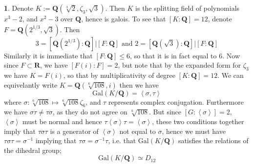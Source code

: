 \documentclass[11pt]{article}
\theoremstyle{definition}
\newtheorem{pb}{}
\newcommand{\gen}[1]{\left\langle #1 \right\rangle}
\newcommand{\tand}{\text{ and }}
\newcommand{\gal}{\text{Gal}}
\begin{document}
    \begin{pb}
        Denote \(K := \mathbf{Q}(\sqrt[3]{2},\zeta_3,\sqrt{3})\). Then \(K\) is the splitting field of polynomials \(x^3 - 2\), and \(x^2 - 3\) over \(\mathbf{Q}\), hence is galois. To see that \([K:\mathbf{Q}] = 12\), denote \(F = \mathbf{Q}(2^{1/3},\sqrt{3})\). Then
        \[3 = [\mathbf{Q}(2^{1/3}):\mathbf{Q}]\vert[F:\mathbf{Q}] \tand 2 = [\mathbf{Q}(\sqrt{3}):\mathbf{Q}]\vert[F:\mathbf{Q}]\]
        Similarly it is immediate that \([F:\mathbf{Q}] \leq 6\), so that it is in fact equal to 6.
        Now since \(F \subset \mathbf{R}\), we have \([F(i):F] = 2\), but note that by the expanded form for \(\zeta_3\) we have \(K = F(i)\), so that by multiplicativity of degree \([K:\mathbf{Q}] = 12\). We can equivelantly write \(K = \mathbf{Q}(\sqrt[6]{108},i)\) then we have
        \[\gal(K/\mathbf{Q}) = \gen{\sigma,\tau}\]
        where \(\sigma: \sqrt[6]{108} \mapsto \sqrt[6]{108}\zeta_6\), and \(\tau\) represents complex conjugation. Furthermore we have \(\sigma\tau \neq \tau\sigma\), as they do not agree on \(\sqrt[6]{108}\). But since \([G:\gen{\sigma}] = 2\), \(\gen{\sigma}\) must be normal and hence \(\tau\gen{\sigma}\tau = \gen{\sigma}\), these two conditions together imply that \(\tau\sigma\tau\) is a generator of \(\gen{\sigma}\) not equal to \(\sigma\), hence we must have \(\tau\sigma\tau = \sigma^{-1}\) implying that \(\tau\sigma = \sigma^{-1}\tau\), i.e. that \(\gal(K/\mathbf{Q})\) satisfies the relations of the dihedral group;
        \[\gal(K/\mathbf{Q}) \simeq D_{12}\]
        
    \end{pb}
\end{document}
